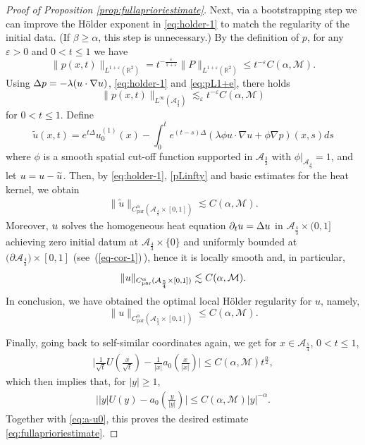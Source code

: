 \documentclass[12pt,reqno]{amsart}
\theoremstyle{plain}
\theoremstyle{definition}
\newcommand{\R}{\mathbb{R}}
\newcommand{\M}{\mathcal{M}}
\newcommand{\A}{\mathcal{A}}
\renewcommand{\:}{\colon}
\let\div\relax
\DeclareMathOperator{\div}{div}
\let\hat\relax
\newcommand{\hat}[1]{\widehat{#1}}
\numberwithin{equation}{section}
\numberwithin{figure}{section}
\begin{document}
\begin{proof}[Proof of Proposition \ref{prop:fullaprioriestimate}]
Next, via a bootstrapping step we can improve the H\"older exponent in \eqref{eq:holder-1} to match the regularity of the initial data. (If $\beta \ge \alpha$,  this step is unnecessary.) By the definition of $p$, for any $\varepsilon>0$ and $0<t \le 1$ we have
\begin{equation} \label{eq:pL1+e}
    \|p(x,t)\|_{L^{1+\varepsilon}(\R^2)} = t^{-\frac{\varepsilon}{1+\varepsilon}}\|P\|_{L^{1+\varepsilon}(\R^2)} \le t^{-\varepsilon} C(\alpha, \M).
\end{equation}
Using  $\Delta p = -\lambda \div (u \cdot \nabla u)$, \eqref{eq:holder-1} and \eqref{eq:pL1+e}, there holds
\begin{equation} \label{pLinfty}
    \|p(x,t)\|_{L^{\infty}(\A_{\frac32})} \lesssim_{\varepsilon} t^{-\varepsilon} C(\alpha, \M)
\end{equation}
for $0< t \le 1$. Define 
\begin{equation}
    \widetilde{u} (x,t) = e^{t\Delta} u_0^{(1)} (x) - \int_0^t e^{(t-s)\Delta} (\lambda \phi u \cdot \nabla u + \phi \nabla p) (x,s) ds
\end{equation}
where $\phi$ is a smooth spatial cut-off function supported in $\A_{\frac32}$ with $\phi|_{\A_{\frac43}} = 1$, and let $\hat{u} = u-\widetilde{u}$. Then, by \eqref{eq:holder-1}, \eqref{pLinfty} and basic estimates for the heat kernel, we obtain
\begin{eqnarray}
    \|\widetilde{u}\|_{C_{\text{par}}^{\alpha}(\A_{\frac43} \times [0, 1])} \lesssim C(\alpha, \M).
\end{eqnarray}
Moreover, $\hat{u}$ solves the homogeneous heat equation $\partial_t \hat{u} = \Delta \hat{u}$ in $\A_{\frac43} \times (0,1]$ achieving zero initial datum at $\A_{\frac43} \times \{0\}$ and uniformly bounded at $\bigl(\partial \A_{\frac43}\bigr)\times[0,1]$ (see~(\ref{eq-cor-1})\,), hence it is locally smooth and, in particular,
\begin{equation}
    \|\hat{u}\|_{C_{\text{par}}^{\alpha}(\A_{\frac54} \times [0, 1])} \lesssim C(\alpha, \M).
\end{equation}
In conclusion, we have obtained the optimal local H\"older regularity for $u$, namely,
\begin{equation} \label{eq:u-Holder}
	\|u\|_{C_{\text{par}}^{\alpha}(\A_{\frac54} \times [0, 1])} \le C(\alpha, \M).
\end{equation}

Finally, going back to self-similar coordinates again, we get for $x \in \A_{\frac54}$, $0 < t \le 1$,
\begin{align}
    \biggl|\frac{1}{\sqrt{t}} U\left(\frac{x}{\sqrt{t}}\right) - \frac{1}{|x|} a_0\left(\frac{x}{|x|}\right)\biggr| \le C(\alpha, \M) t^{\frac{\alpha}{2}},
\end{align}
which then implies that, for $|y| \ge 1$,
\begin{align}
    \biggl|   |y| U(y) -  a_0\left(\frac{y}{|y|}\right)  \biggr| \le C(\alpha, \M) |y|^{-\alpha}.
\end{align}
Together with \eqref{eq:a-u0}, this proves the desired estimate \eqref{eq:fullaprioriestimate}.
\end{proof}
\end{document}
